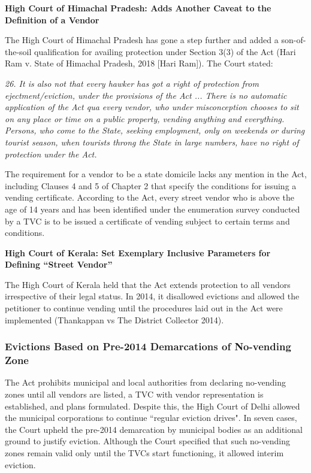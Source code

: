\documentclass[a4paper, 12pt, twoside]{article}
\begin{document}
{\textbf{High Court of Himachal Pradesh: Adds Another Caveat to the Definition of a Vendor}

The High Court of Himachal Pradesh has gone a step further and added a son-of-the-soil qualification for availing protection under Section 3(3) of the Act (Hari Ram v. State of Himachal Pradesh, 2018 [Hari Ram]). The Court stated:

\textit{26. It is also not that every hawker has got a right of protection from ejectment/eviction, under the provisions of the Act ... There is no automatic application of the Act qua every vendor, who under misconception chooses to sit on any place or time on a public property, vending anything and everything. Persons, who come to the State, seeking employment, only on weekends or during tourist season, when tourists throng the State in large numbers, have no right of protection under the Act.}

The requirement for a vendor to be a state domicile lacks any mention in the Act, including Clauses 4 and 5 of Chapter 2 that specify the conditions for issuing a vending certificate. According to the Act, every street vendor who is above the age of 14 years and has been identified under the enumeration survey conducted by a TVC is to be issued a certificate of vending subject to certain terms and conditions.

\textbf{High Court of Kerala: Set Exemplary Inclusive Parameters for Defining “Street Vendor”}

The High Court of Kerala held that the Act extends protection to all vendors irrespective of their legal status. In 2014, it disallowed evictions and allowed the petitioner to continue vending until the procedures laid out in the Act were implemented (Thankappan vs The District Collector 2014). 

\subsubsection*{Evictions Based on Pre-2014 Demarcations of No-vending Zone}

The Act prohibits municipal and local authorities from declaring no-vending zones until all vendors are listed, a TVC with vendor representation is established, and plans formulated. Despite this, the High Court of Delhi allowed the municipal corporations to continue “regular eviction drives". In seven cases, the Court upheld the pre-2014 demarcation by municipal bodies as an additional ground to justify eviction. Although the Court specified that such no-vending zones remain valid only until the TVCs start functioning, it allowed interim eviction.

}
\end{document}
